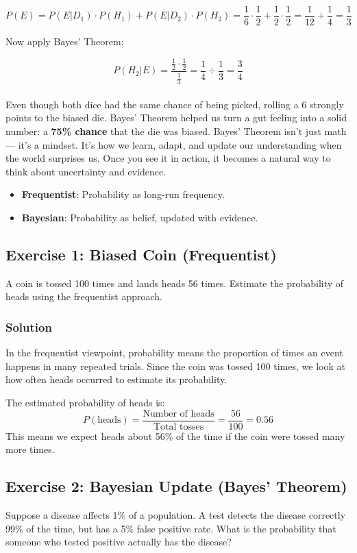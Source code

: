 \documentclass{book}
\begin{document}
\[
P(E) = P(E | D_1) \cdot P(H_1) + P(E | D_2) \cdot P(H_2) = \frac{1}{6} \cdot \frac{1}{2} + \frac{1}{2} \cdot \frac{1}{2}
= \frac{1}{12} + \frac{1}{4} = \frac{1}{3}
\]

Now apply Bayes' Theorem:

\[
P(H_2 | E) = \frac{\frac{1}{2} \cdot \frac{1}{2}}{\frac{1}{3}} = \frac{1}{4} \div \frac{1}{3} = \frac{3}{4}
\]\\

Even though both dice had the same chance of being picked, rolling a 6 strongly points to the biased die. Bayes’ Theorem helped us turn a gut feeling into a solid number: a \textbf{75\% chance} that the die was biased. Bayes’ Theorem isn’t just math — it’s a mindset. It’s how we learn, adapt, and update our understanding when the world surprises us. Once you see it in action, it becomes a natural way to think about uncertainty and evidence.

\begin{itemize}
    \item \textbf{Frequentist}: Probability as long-run frequency.
    \item \textbf{Bayesian}: Probability as belief, updated with evidence.
\end{itemize}

\newpage

\subsection*{Exercise 1: Biased Coin (Frequentist)}
A coin is tossed 100 times and lands heads 56 times. Estimate the probability of heads using the frequentist approach.

\subsubsection*{Solution}
In the frequentist viewpoint, probability means the proportion of times an event happens in many repeated trials. Since the coin was tossed 100 times, we look at how often heads occurred to estimate its probability.

The estimated probability of heads is:
\[
P(\text{heads}) = \frac{\text{Number of heads}}{\text{Total tosses}} = \frac{56}{100} = 0.56
\]
This means we expect heads about 56\% of the time if the coin were tossed many more times.

\subsection*{Exercise 2: Bayesian Update (Bayes' Theorem)}
Suppose a disease affects 1\% of a population. A test detects the disease correctly 99\% of the time, but has a 5\% false positive rate. What is the probability that someone who tested positive actually has the disease?
\end{document}
